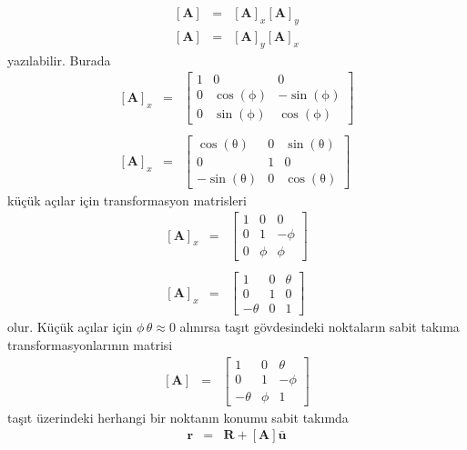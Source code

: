 \documentclass[a4paper]{report}
\begin{document}
\begin{eqnarray*}
\left[ \mathbf{A}\right] &=&\left[ \mathbf{A}\right]_x \left[ \mathbf{A}\right]_y \\
\left[ \mathbf{A}\right] &=&\left[ \mathbf{A}\right]_y \left[ \mathbf{A}\right]_x
\end{eqnarray*}
yazılabilir. Burada
\begin{eqnarray*}
\left[ \mathbf{A}\right]_x &=&\left[\begin{array}{ccc} 1 & 0 & 0\\ 0 & \cos\!\left(\mathrm{\phi}\right) & - \sin\!\left(\mathrm{\phi}\right)\\ 0 & \sin\!\left(\mathrm{\phi}\right) & \cos\!\left(\mathrm{\phi}\right) \end{array}\right]\\
\\
\left[ \mathbf{A}\right]_x &=&\left[\begin{array}{ccc} \cos\!\left(\mathrm{\theta}\right) & 0 & \sin\!\left(\mathrm{\theta}\right)\\ 0 & 1 & 0\\ - \sin\!\left(\mathrm{\theta}\right) & 0 & \cos\!\left(\mathrm{\theta}\right) \end{array}\right]
\end{eqnarray*}
küçük açılar için transformasyon matrisleri
\begin{eqnarray*}
\left[ \mathbf{A}\right]_x &=&\left[\begin{array}{ccc} 1 & 0 & 0\\ 0 & 1 & - \phi\\ 0 & \phi & \phi \end{array}\right]\\
\\
\left[ \mathbf{A}\right]_x &=&\left[\begin{array}{ccc} 1 & 0 & \theta\\ 0 & 1 & 0\\ - \theta & 0 & 1 \end{array}\right]
\end{eqnarray*}
olur. Küçük açılar için $\phi \, \theta \approx 0$ alınırsa taşıt gövdesindeki noktaların sabit takıma transformasyonlarının matrisi
\begin{eqnarray*}
\left[ \mathbf{A}\right] &=&\left[\begin{array}{ccc} 1 & 0 & \theta\\ 0 & 1 & - \phi\\ -\theta & \phi & 1 \end{array}\right]
\end{eqnarray*}
taşıt üzerindeki herhangi bir noktanın konumu sabit takımda
\begin{eqnarray*}
\mathbf{r}&=&\mathbf{R}+\left[ \mathbf{A}\right] \mathbf{\bar{u}}
\end{eqnarray*}
\end{document}
